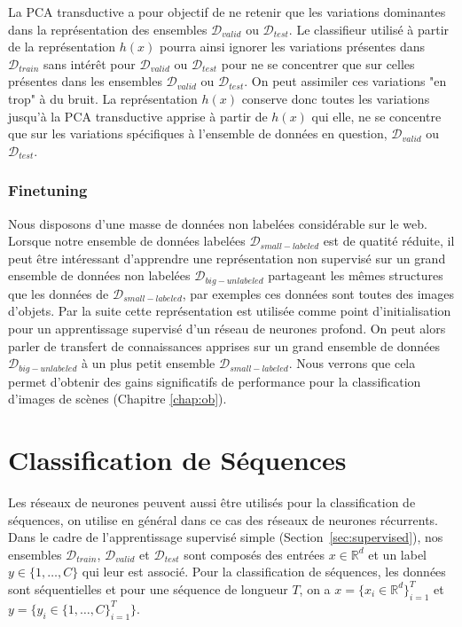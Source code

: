 La PCA transductive a pour objectif de ne retenir que les variations dominantes
dans la représentation des ensembles $\mathcal{D}_{valid}$ ou
$\mathcal{D}_{test}$. Le classifieur utilisé à partir de la représentation
$h(x)$ pourra ainsi ignorer les variations présentes dans $\mathcal{D}_{train}$
sans intérêt pour $\mathcal{D}_{valid}$ ou $\mathcal{D}_{test}$ pour ne se
concentrer que sur celles présentes dans les ensembles $\mathcal{D}_{valid}$ ou
$\mathcal{D}_{test}$. On peut assimiler ces variations "en trop" à du bruit. La
représentation $h(x)$ conserve donc toutes les variations jusqu'à la PCA
transductive apprise à partir de $h(x)$ qui elle, ne se concentre que sur les
variations spécifiques à l'ensemble de données en question,
$\mathcal{D}_{valid}$ ou $\mathcal{D}_{test}$. 

\subsubsection{Finetuning}

Nous disposons d'une masse de données non labelées considérable sur le web.
Lorsque notre ensemble de données labelées $\mathcal{D}_{small-labeled}$ est de
quatité réduite, il peut être intéressant d'apprendre une représentation non
supervisé sur un grand ensemble de données non labelées
$\mathcal{D}_{big-unlabeled}$ partageant les mêmes structures que les données
de $\mathcal{D}_{small-labeled}$, par exemples ces données sont toutes des
images d'objets. Par la suite cette représentation est utilisée comme point
d'initialisation pour un apprentissage supervisé d'un réseau de neurones
profond. On peut alors parler de transfert de connaissances apprises sur un
grand ensemble de données $\mathcal{D}_{big-unlabeled}$ à un plus petit
ensemble $\mathcal{D}_{small-labeled}$.  Nous verrons que cela permet d'obtenir
des gains significatifs de performance pour la classification d'images de
scènes (Chapitre \ref{chap:ob}).

\section{Classification de Séquences}

Les réseaux de neurones peuvent aussi être utilisés pour la classification de
séquences, on utilise en général dans ce cas des réseaux de neurones récurrents.
Dans le cadre de l'apprentissage supervisé simple
(Section~\ref{sec:supervised}), nos ensembles $\mathcal{D}_{train}$,
$\mathcal{D}_{valid}$ et  $\mathcal{D}_{test}$  sont composés des entrées
$x\in\mathbb{R}^{d}$ et un label $y\in\{1,\dots ,C\}$ qui leur est associé.
Pour la classification de séquences, les données sont séquentielles et pour une
séquence de longueur $T$, on a $x=\lbrace x_{i}\in\mathbb{R}^{d}
\rbrace_{i=1}^{T}$ et $y=\lbrace y_{i}\in\{1,\dots ,C\}_{i=1}^{T}\}$.

